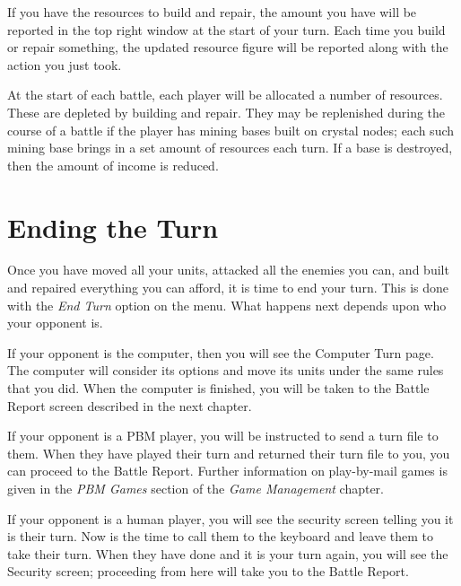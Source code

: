 If you have the resources to build and repair, the amount you have will be reported in the top right window at the start of your turn. Each time you build or repair something, the updated resource figure will be reported along with the action you just took.

At the start of each battle, each player will be allocated a number of resources. These are depleted by building and repair. They may be replenished during the course of a battle if the player has mining bases built on crystal nodes; each such mining base brings in a set amount of resources each turn. If a base is destroyed, then the amount of income is reduced.

\section{Ending the Turn}

\noindent
Once you have moved all your units, attacked all the enemies you can, and built and repaired everything you can afford, it is time to end your turn. This is done with the {\it End Turn} option on the menu. What happens next depends upon who your opponent is.

If your opponent is the computer, then you will see the Computer Turn page. The computer will consider its options and move its units under the same rules that you did. When the computer is finished, you will be taken to the Battle Report screen described in the next chapter.

If your opponent is a PBM player, you will be instructed to send a turn file to them. When they have played their turn and returned their turn file to you, you can proceed to the Battle Report. Further information on play-by-mail games is given in the {\it PBM Games} section of the {\it Game Management} chapter.

If your opponent is a human player, you will see the security screen telling you it is their turn. Now is the time to call them to the keyboard and leave them to take their turn. When they have done and it is your turn again, you will see the Security screen; proceeding from here will take you to the Battle Report.
